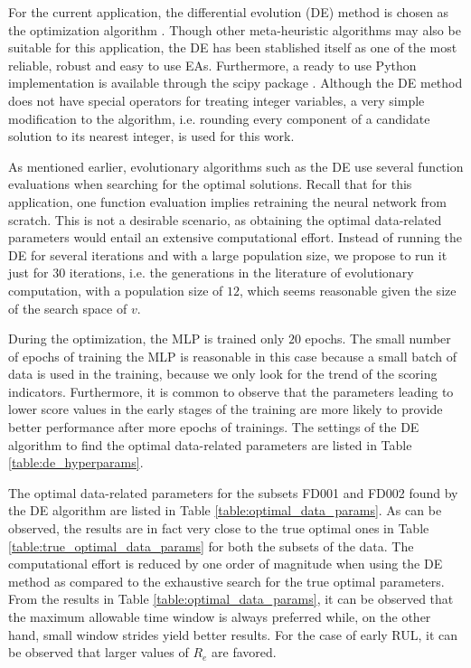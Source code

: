 \documentclass[preprint,12pt]{elsarticle}%
\begin{document}
For the current application, the differential evolution (DE) method is chosen
as the optimization algorithm \cite{Storn1997}. Though other meta-heuristic
algorithms may also be suitable for this application, the DE has been
stablished itself as one of the most reliable, robust and easy to use EAs.
Furthermore, a ready to use Python implementation is available through the
scipy package \cite{scipy}. Although the DE method does not have special
operators for treating integer variables, a very simple modification to the
algorithm, i.e. rounding every component of a candidate solution to its
nearest integer, is used for this work.

As mentioned earlier, evolutionary algorithms such as the DE use several
function evaluations when searching for the optimal solutions. Recall that for
this application, one function evaluation implies retraining the neural
network from scratch. This is not a desirable scenario, as obtaining the
optimal data-related parameters would entail an extensive computational
effort. Instead of running the DE for several iterations and with a large
population size, we propose to run it just for $30$ iterations, i.e. the
generations in the literature of evolutionary computation, with a population
size of $12$, which seems reasonable given the size of the search space of $v$.

During the optimization, the MLP is trained only $20$ epochs. The small number
of epochs of training the MLP is reasonable in this case because a small batch
of data is used in the training, because we only look for the trend of the scoring indicators.
Furthermore, it is common to observe that the parameters leading to lower
score values in the early stages of the training are more likely to provide
better performance after more epochs of trainings. The settings of
the DE algorithm to find the optimal data-related parameters are listed in
Table \ref{table:de_hyperparams}.

The optimal data-related parameters for the subsets FD001 and FD002 found by
the DE algorithm are listed in Table \ref{table:optimal_data_params}. As can be
observed, the results are in fact very close to the true optimal ones 
in Table \ref{table:true_optimal_data_params} for both the subsets of the
data. The computational effort is reduced by one order of magnitude when using
the DE method as compared to the exhaustive search for the true optimal
parameters. From the results in Table \ref{table:optimal_data_params}, it can
be observed that the maximum allowable time window is always preferred while,
on the other hand, small window strides yield better results. For the case of
early RUL, it can be observed that larger values of $R_{e}$ are favored.
\end{document}
